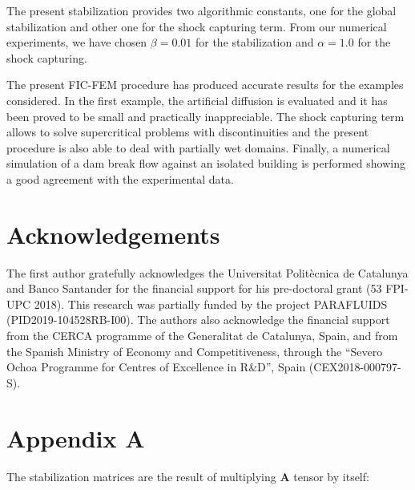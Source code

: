 \documentclass[a4paper,12pt]{elsarticle}
\begin{document}
The present stabilization provides two algorithmic constants, one for the global stabilization and other one for the shock capturing term. From our numerical experiments, we have chosen $\beta=0.01$ for the stabilization and $\alpha=1.0$ for the shock capturing.

The present FIC-FEM procedure has produced accurate results for the examples considered.
In the first example, the artificial diffusion is evaluated and it has been proved to be small and practically inappreciable. The shock capturing term allows to solve supercritical problems with discontinuities and the present procedure is also able to deal with partially wet domains. Finally, a numerical simulation of a dam break flow against an isolated building is performed showing a good agreement with the experimental data.



\section{Acknowledgements}

The first author gratefully acknowledges the Universitat Politècnica de Catalunya and Banco Santander for the financial support for his pre-doctoral grant (53 FPI-UPC 2018).
This research was partially funded by the project PARAFLUIDS (PID2019-104528RB-I00). The authors also acknowledge the financial support from the CERCA programme of the Generalitat de Catalunya, Spain, and from the Spanish Ministry of Economy and Competitiveness, through the “Severo Ochoa Programme for Centres of Excellence in R\&D”, Spain (CEX2018-000797-S).



\section*{Appendix A}

The stabilization matrices are the result of multiplying $\mathbf{A}$ tensor by itself:
\end{document}
